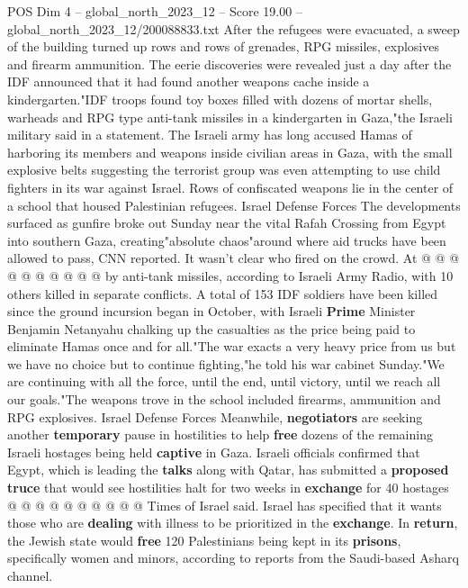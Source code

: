 \begin{textsample}{POS Dim 4 – global\_north\_2023\_12 – Score 19.00 – global\_north\_2023\_12/200088833.txt}  \label{ex:f4_pos_314}
After the refugees were evacuated, a sweep of the building turned up rows and rows of grenades, RPG missiles, explosives and firearm ammunition.
The eerie discoveries were revealed just a day after the IDF announced that it had found another weapons cache inside a kindergarten."IDF troops found toy boxes filled with dozens of mortar shells, warheads and RPG type anti-tank missiles in a kindergarten in Gaza,"the Israeli military said in a statement.
The Israeli army has long accused Hamas of harboring its members and weapons inside civilian areas in Gaza, with the small explosive belts suggesting the terrorist group was even attempting to use child fighters in its war against Israel.
Rows of confiscated weapons lie in the center of a school that housed Palestinian refugees.
Israel Defense Forces The developments surfaced as gunfire broke out Sunday near the vital Rafah Crossing from Egypt into southern Gaza, creating"absolute chaos"around where aid trucks have been allowed to pass, CNN reported.
It wasn't clear who fired on the crowd.
At @ @ @ @ @ @ @ @ @ @ by anti-tank missiles, according to Israeli Army Radio, with 10 others killed in separate conflicts.
A total of 153 IDF soldiers have been killed since the ground incursion began in October, with Israeli \textbf{Prime} Minister Benjamin Netanyahu chalking up the casualties as the price being paid to eliminate Hamas once and for all."The war exacts a very heavy price from us but we have no choice but to continue fighting,"he told his war cabinet Sunday."We are continuing with all the force, until the end, until victory, until we reach all our goals."The weapons trove in the school included firearms, ammunition and RPG explosives.
Israel Defense Forces Meanwhile, \textbf{negotiators} are seeking another \textbf{temporary} pause in hostilities to help \textbf{free} dozens of the remaining Israeli hostages being held \textbf{captive} in Gaza.
Israeli officials confirmed that Egypt, which is leading the \textbf{talks} along with Qatar, has submitted a \textbf{proposed} \textbf{truce} that would see hostilities halt for two weeks in \textbf{exchange} for 40 hostages @ @ @ @ @ @ @ @ @ @ Times of Israel said.
Israel has specified that it wants those who are \textbf{dealing} with illness to be prioritized in the \textbf{exchange}.
In \textbf{return}, the Jewish state would \textbf{free} 120 Palestinians being kept in its \textbf{prisons}, specifically women and minors, according to reports from the Saudi-based Asharq channel.

\end{textsample}
